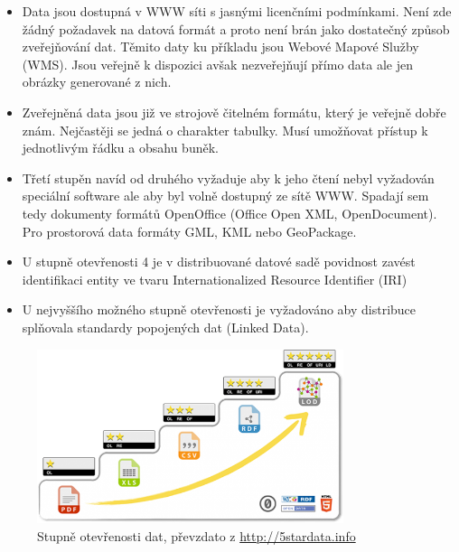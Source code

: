 \begin{itemize}

    \item   Data jsou dostupná v WWW síti s jasnými licenčními podmínkami.
            Není zde žádný požadavek na datová formát a proto není brán jako
            dostatečný způsob zveřejňování dat. Těmito daty ku příkladu jsou
            Webové Mapové Služby (WMS). Jsou veřejně k dispozici avšak
            nezveřejňují přímo data ale jen obrázky generované z nich.

    \item   Zveřejněná data jsou již ve strojově čitelném formátu, který je
            veřejně dobře znám. Nejčastěji se jedná o charakter tabulky.
            Musí umožňovat přístup k jednotlivým řádku a obsahu buněk.

    \item   Třetí stupěn navíd od druhého vyžaduje aby k jeho čtení nebyl
            vyžadován speciální software ale aby byl volně dostupný ze sítě WWW.
            Spadají sem tedy dokumenty formátů OpenOffice (Office Open XML,
            OpenDocument). Pro prostorová data formáty GML, KML nebo GeoPackage.

    \item   U stupně otevřenosti 4 je v distribuované datové sadě
            povidnost zavést identifikaci entity ve tvaru Internationalized
            Resource Identifier (IRI)

    \item   U nejvyššího možného stupně otevřenosti je vyžadováno aby distribuce
            splňovala standardy popojených dat (Linked Data).

\end{itemize}

\begin{figure}[hbt]%
    \centering
    \includegraphics[width=0.8\textwidth]{./pictures/5star-steps.png}
    \caption{Stupně otevřenosti dat, převzdato z \url{http://5stardata.info}}
    \label{fig:Stupně otevřenosti dat}
\end{figure}

